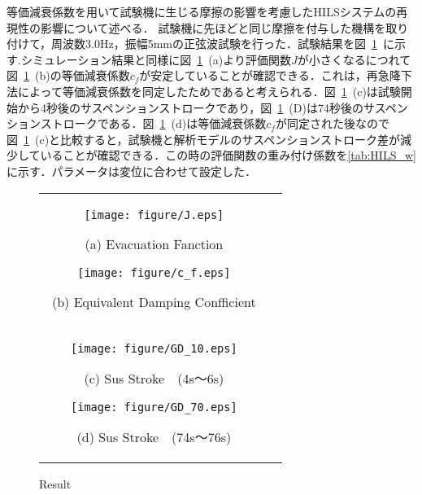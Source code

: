 \documentclass[a4paper,12pt]{article_vdlab_sotsuron}
\begin{document}
\newpage
等価減衰係数を用いて試験機に生じる摩擦の影響を考慮したHILSシステムの再現性の影響について述べる．
試験機に先ほどと同じ摩擦を付与した機構を取り付けて，周波数3.0Hz，振幅5mmの正弦波試験を行った．試験結果を図~\ref{fig:HILS_test}~に示す.シミュレーション結果と同様に図~\ref{fig:HILS_test}~(a)より評価関数$J$が小さくなるにつれて図~\ref{fig:HILS_test}~(b)の等価減衰係数$c_f$が安定していることが確認できる．これは，再急降下法によって等価減衰係数を同定したためであると考えられる．図~\ref{fig:HILS_test}~(c)は試験開始から4秒後のサスペンションストロークであり，図~\ref{fig:HILS_test}~(D)は74秒後のサスペンションストロークである．図~\ref{fig:HILS_test}~(d)は等価減衰係数$c_f$が同定された後なので図~\ref{fig:HILS_test}~(c)と比較すると，試験機と解析モデルのサスペンションストローク差が減少していることが確認できる．この時の評価関数の重み付け係数を\ref{tab:HILS_w}に示す．パラメータは変位に合わせて設定した．
\vspace{10mm}
  \begin{figure}[h]
      \begin{tabular}{cc}
        \begin{minipage}{0.5\hsize}
          \centering
          \texttt{[image: figure/J.eps]}
          \begin{center}
            \vspace{-4mm}
            \ (a) Evacuation Fanction\
          \end{center}
        \end{minipage}
        \begin{minipage}{0.5\hsize}
          \centering
          \texttt{[image: figure/c\_f.eps]}
          \begin{center}
            \vspace{-4mm}
            \ (b)  Equivalent Damping Confficient\
          \end{center}
        \end{minipage}\\
          \begin{minipage}{0.5\hsize}
            \centering
            \texttt{[image: figure/GD\_10.eps]}
            \begin{center}
              \vspace{-4mm}
              \ (c) Sus Stroke　(4s～6s)\
            \end{center}
          \end{minipage}
          \begin{minipage}{0.5\hsize}
            \centering
            \texttt{[image: figure/GD\_70.eps]}
            \begin{center}
              \vspace{-4mm}
              \ (d) Sus Stroke　(74s～76s)\
            \end{center}
          \end{minipage}
        \end{tabular}
        \vspace{-1mm}
      \caption{Result}
      \label{fig:HILS_test}
  \end{figure}
\end{document}
